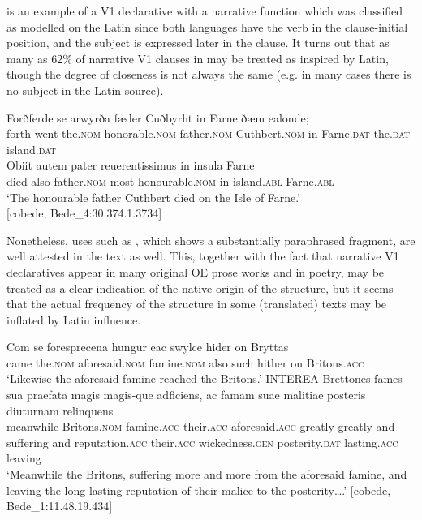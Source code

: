 \documentclass[output=paper,colorlinks,citecolor=brown]{langscibook}
\begin{document}
 is an example of a V1 declarative with a narrative function which was classified as  modelled on the Latin since both languages have the verb in the clause-initial position, and the subject is expressed later in the clause. It turns out that as many as 62\% of narrative V1 clauses in  may be treated as inspired by Latin, though the degree of closeness is not always the same (e.g. in many cases there is no subject in the Latin source).

\ea \label{ex:cichosz:11}%
\ea \label{ex:cichosz:11a}
\gll Forðferde   se     arwyrða     fæder Cuðbyrht   in   Farne     ðæm     ealonde;\\
forth-went  the.\textsc{nom}  honorable.\textsc{nom}  father.\textsc{nom} Cuthbert.\textsc{nom}  in   Farne.\textsc{dat}  the.\textsc{dat}   island.\textsc{dat}\\
\glt
\ex \label{ex:cichosz:11b}
\gll Obiit   autem   pater     reuerentissimus     in   insula Farne \\
died  also  father.\textsc{nom} {most honourable.\textsc{nom}}  in  island.\textsc{abl} Farne.\textsc{abl}\\
\glt ‘The honourable father Cuthbert died on the Isle of Farne.'\\ \hfill [cobede, Bede\_4:30.374.1.3734]
\z 
\z

Nonetheless,  uses such as , which shows a substantially paraphrased fragment, are well attested in the text as well. This, together with the fact that narrative V1 declaratives appear in many original OE prose works and in poetry, may be treated as a clear indication of the native origin of the structure, but it seems that the actual frequency of the structure in some (translated) texts may be inflated by Latin influence.

\ea    \label{ex:cichosz:12}%
\ea    \label{ex:cichosz:12a}
\gll Com   se     foresprecena   hungur     eac   swylce hider   on   Bryttas \\
came  the.\textsc{nom}  aforesaid.\textsc{nom} famine.\textsc{nom}  also   such hither  on  Britons.\textsc{acc}\\
\glt ‘Likewise the aforesaid famine reached the Britons.' 
\ex    \label{ex:cichosz:12b}
\gll INTEREA   Brettones   fames     sua     praefata        magis    magis-que   adficiens,   ac   famam       suae malitiae     posteris   diuturnam   relinquens \\
    meanwhile  Britons.\textsc{nom}  famine.\textsc{acc}  their.\textsc{acc} aforesaid.\textsc{acc} greatly greatly-and  suffering  and  reputation.\textsc{acc}    their.\textsc{acc} wickedness.\textsc{gen}   posterity.\textsc{dat}  lasting.\textsc{acc}  leaving\\
\glt ‘Meanwhile the Britons, suffering more and more from the aforesaid famine, and leaving the long-lasting reputation of their malice to the posterity….' \hfill [cobede, Bede\_1:11.48.19.434]
\z 
\z
           
\end{document}
